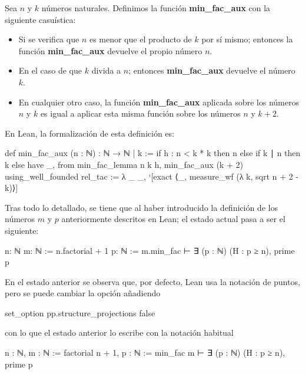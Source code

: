 \begin{definicion}
  Sea \(n\) y \(k\) números naturales. Definimos la función
  \textbf{min\_fac\_aux} con la siguiente casuística:
  \begin{itemize}
  \item  Si se verifica que \(n\) es menor que el producto de \(k\) por sí
    mismo; entonces la función \textbf{min\_fac\_aux} devuelve el propio
    número \(n\).

  \item En el caso de que \(k\) divida a \(n\); entonces
    \textbf{min\_fac\_aux} devuelve el número \(k\).

  \item En cualquier otro caso, la función \textbf{min\_fac\_aux} aplicada
    sobre los números \(n\) y \(k\) es igual a aplicar esta misma función
    sobre los números \(n\) y \(k+2\).
  \end{itemize}
\end{definicion}

En Lean, la formalización de esta definición es:

\begin{leancode}
def min_fac_aux (n : ℕ) : ℕ → ℕ | k :=
  if h : n < k * k then n else
  if k ∣ n then k else
  have _, from min_fac_lemma n k h,
  min_fac_aux (k + 2)
  using_well_founded {rel_tac :=
    λ _ _, `[exact ⟨_, measure_wf (λ k, sqrt n + 2 - k)⟩]}
\end{leancode}


Tras todo lo detallado, se tiene que al haber introducido la definición de los
números \(m\) y \(p\) anteriormente descritos en Lean; el estado actual pasa a
ser el siguiente:
\begin{leancode}
n: ℕ
m: ℕ := n.factorial + 1
p: ℕ := m.min_fac
⊢ ∃ (p : ℕ) (H : p ≥ n), prime p
\end{leancode}

En el estado anterior se observa que, por defecto, Lean usa la notación
de puntos, pero se puede cambiar la opción añadiendo
\begin{leancode}
set_option pp.structure_projections false
\end{leancode}
con lo que el estado anterior lo escribe con la notación habitual
\begin{leancode}
n : ℕ,
m : ℕ := factorial n + 1,
p : ℕ := min_fac m
⊢ ∃ (p : ℕ) (H : p ≥ n), prime p
\end{leancode}

